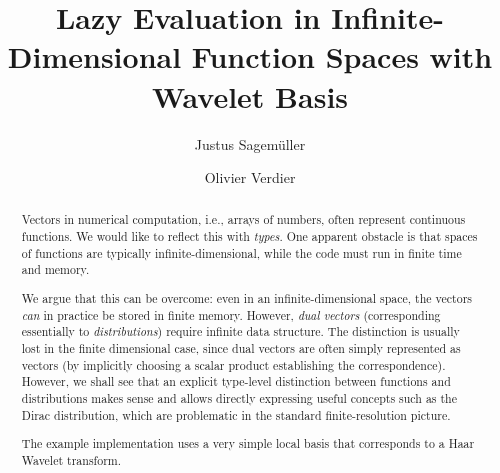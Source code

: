 \documentclass[sigplan,screen]{acmart}
\theoremstyle{acmplain}
\theoremstyle{acmdefinition}
\begin{document}
\title[Lazy Evaluation in Infinite-Dimensional Function Spaces...]
      {Lazy Evaluation in Infinite-Dimensional Function Spaces with Wavelet Basis}


\author{Justus Sagemüller}

\author{Olivier Verdier}


\begin{abstract}
Vectors in numerical computation, i.e., arrays of numbers, often represent continuous functions.
We would like to reflect this with \emph{types}.
One apparent obstacle is that spaces of functions are typically infinite-dimensional,
while the code must run in finite time and memory.

We argue that this can be overcome: even in an infinite-dimensional space, the vectors \emph{can} in practice be stored in finite memory.
However, \emph{dual vectors} (corresponding essentially to \emph{distributions}) require infinite data structure.
The distinction is usually lost in the finite dimensional case, since dual vectors are often simply represented as vectors (by implicitly choosing a scalar product establishing the correspondence).
However, we shall see that an explicit type-level distinction between functions and distributions makes sense and allows directly expressing useful concepts such as the Dirac distribution, which are problematic in the standard finite-resolution picture.

The example implementation uses a very simple local basis that corresponds to a Haar Wavelet transform.
\end{abstract}
\end{document}
